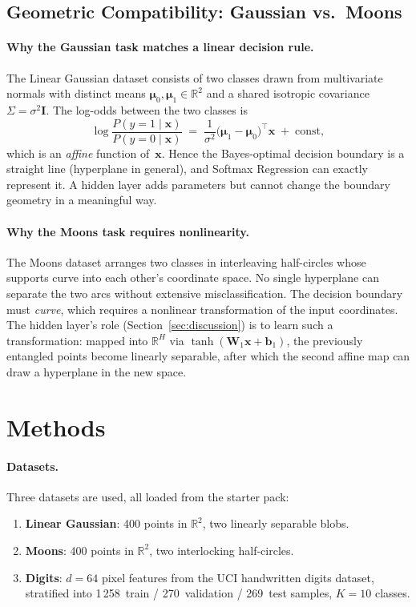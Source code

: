 \documentclass[11pt]{article}
\newcommand{\R}{\mathbb{R}}
\newcommand{\bx}{\mathbf{x}}
\newcommand{\bW}{\mathbf{W}}
\newcommand{\bb}{\mathbf{b}}
\begin{document}
\subsection{Geometric Compatibility: Gaussian vs.\ Moons}
\label{sec:geometry}

\paragraph{Why the Gaussian task matches a linear decision rule.}
The Linear Gaussian dataset consists of two classes drawn from multivariate normals with distinct
means $\boldsymbol{\mu}_0,\boldsymbol{\mu}_1\in\R^2$ and a shared isotropic covariance
$\Sigma=\sigma^2\mathbf{I}$.  The log-odds between the two classes is
\[
  \log\frac{P(y{=}1\mid\bx)}{P(y{=}0\mid\bx)}
  \;=\;
  \frac{1}{\sigma^2}\bigl(\boldsymbol{\mu}_1-\boldsymbol{\mu}_0\bigr)^\top\bx
  \;+\;\text{const},
\]
which is an \emph{affine} function of~$\bx$.  Hence the Bayes-optimal decision boundary is a
straight line (hyperplane in general), and Softmax Regression can exactly represent it.  A hidden
layer adds parameters but cannot change the boundary geometry in a meaningful way.

\paragraph{Why the Moons task requires nonlinearity.}
The Moons dataset arranges two classes in interleaving half-circles whose supports curve into each
other's coordinate space.  No single hyperplane can separate the two arcs without extensive
misclassification.  The decision boundary must \emph{curve}, which requires a nonlinear
transformation of the input coordinates.  The hidden layer's role (Section~\ref{sec:discussion})
is to learn such a transformation: mapped into $\R^H$ via $\tanh(\bW_1\bx+\bb_1)$, the
previously entangled points become linearly separable, after which the second affine map can draw
a hyperplane in the new space.

\section{Methods}

\paragraph{Datasets.}
Three datasets are used, all loaded from the starter pack:
\begin{enumerate}[label=\arabic*.,leftmargin=2em,itemsep=0.15em]
  \item \textbf{Linear Gaussian}: 400 points in $\R^2$, two linearly separable blobs.
  \item \textbf{Moons}: 400 points in $\R^2$, two interlocking half-circles.
  \item \textbf{Digits}: $d{=}64$ pixel features from the UCI handwritten digits dataset,
        stratified into 1\,258~train / 270~validation / 269~test samples, $K{=}10$ classes.
\end{enumerate}
\end{document}
